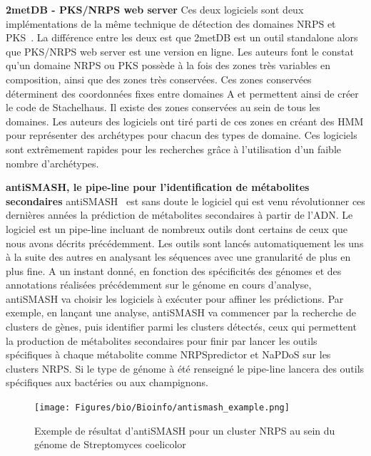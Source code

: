 \textbf{2metDB - PKS/NRPS web server}
Ces deux logiciels sont deux implémentations de la même technique de détection des domaines NRPS et PKS~\cite{bachmann_chapter_2009}.
La différence entre les deux est que 2metDB est un outil standalone alors que PKS/NRPS web server est une version en ligne.
Les auteurs font le constat qu'un domaine NRPS ou PKS possède à la fois des zones très variables en composition, ainsi que des zones très conservées.
Ces zones conservées déterminent des coordonnées fixes entre domaines A et permettent ainsi de créer le code de Stachelhaus.
Il existe des zones conservées au sein de tous les domaines.
Les auteurs des logiciels ont tiré parti de ces zones en créant des HMM pour représenter des archétypes pour chacun des types de domaine.
Ces logiciels sont extrêmement rapides pour les recherches grâce à l'utilisation d'un faible nombre d'archétypes.


\label{antismash}
\textbf{antiSMASH, le pipe-line pour l'identification de métabolites secondaires}
antiSMASH~\cite{weber_antismash_2015,medema_antismash:_2011} est sans doute le logiciel qui est venu révolutionner ces dernières années la prédiction de métabolites secondaires à partir de l'ADN.
Le logiciel est un pipe-line incluant de nombreux outils dont certains de ceux que nous avons décrits précédemment.
Les outils sont lancés automatiquement les uns à la suite des autres en analysant les séquences avec une granularité de plus en plus fine.
A un instant donné, en fonction des spécificités des génomes et des annotations réalisées précédemment sur le génome en cours d'analyse, antiSMASH va choisir les logiciels à exécuter pour affiner les prédictions.
Par exemple, en lançant une analyse, antiSMASH va commencer par la recherche de clusters de gènes, puis identifier parmi les clusters détectés, ceux qui permettent la production de métabolites secondaires pour finir par lancer les outils spécifiques à chaque métabolite comme NRPSpredictor et NaPDoS sur les clusters NRPS.
Si le type de génome à été renseigné le pipe-line lancera des outils spécifiques aux bactéries ou aux champignons.

\begin{figure}
  \begin{center}
    \texttt{[image: Figures/bio/Bioinfo/antismash\_example.png]}
    \caption{\label{antismash_result}Exemple de résultat d'antiSMASH pour un cluster NRPS au sein du génome de Streptomyces coelicolor}
  \end{center}
\end{figure}

